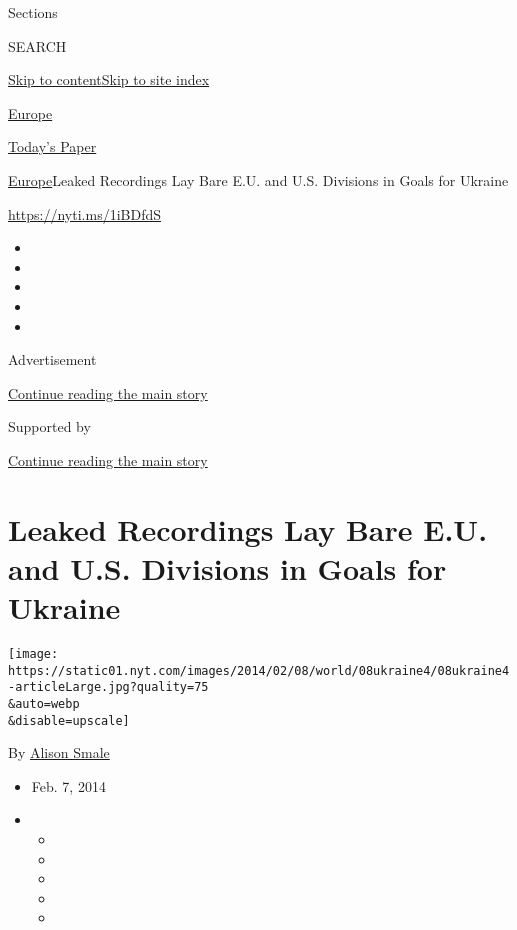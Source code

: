 Sections

SEARCH

\protect\hyperlink{site-content}{Skip to
content}\protect\hyperlink{site-index}{Skip to site index}

\href{https://www.nytimes.com/section/world/europe}{Europe}

\href{https://myaccount.nytimes.com/auth/login?response_type=cookie\&client_id=vi}{}

\href{https://www.nytimes.com/section/todayspaper}{Today's Paper}

\href{/section/world/europe}{Europe}\textbar{}Leaked Recordings Lay Bare
E.U. and U.S. Divisions in Goals for Ukraine

\url{https://nyti.ms/1iBDfdS}

\begin{itemize}
\item
\item
\item
\item
\item
\end{itemize}

Advertisement

\protect\hyperlink{after-top}{Continue reading the main story}

Supported by

\protect\hyperlink{after-sponsor}{Continue reading the main story}

\hypertarget{leaked-recordings-lay-bare-eu-and-us-divisions-in-goals-for-ukraine}{%
\section{Leaked Recordings Lay Bare E.U. and U.S. Divisions in Goals for
Ukraine}\label{leaked-recordings-lay-bare-eu-and-us-divisions-in-goals-for-ukraine}}

\texttt{[image: https://static01.nyt.com/images/2014/02/08/world/08ukraine4/08ukraine4-articleLarge.jpg?quality=75\\\&auto=webp\\\&disable=upscale]}

By \href{http://www.nytimes.com/by/alison-smale}{Alison Smale}

\begin{itemize}
\item
  Feb. 7, 2014
\item
  \begin{itemize}
  \item
  \item
  \item
  \item
  \item
  \end{itemize}
\end{itemize}

